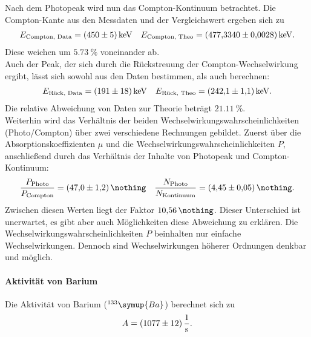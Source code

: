 Nach dem Photopeak wird nun das Compton-Kontinuum betrachtet.
Die Compton-Kante aus den Messdaten und der Vergleichswert ergeben sich zu
\begin{align*}
	E_{\text{Compton, Data}} = \SI{450 (5)}{\kilo \electronvolt} && E_{\text{Compton, Theo}} = \SI{477.3340 (28)}{\kilo \electronvolt}.
\end{align*}
Diese weichen um $\SI{5.73}{\%}$ voneinander ab.\\

Auch der Peak, der sich durch die Rückstreuung der Compton-Wechselwirkung ergibt, lässt sich sowohl aus den Daten bestimmen, als auch berechnen:
\begin{align*}
	E_{\text{Rück, Data}} = \SI{191 (18)}{\kilo \electronvolt} && E_{\text{Rück, Theo}} = \SI{242.1(11)}{\kilo \electronvolt}.
\end{align*}
Die relative Abweichung von Daten zur Theorie beträgt $\SI{21.11}{\%}$.\\

Weiterhin wird das Verhältnis der beiden Wechselwirkungswahrscheinlichkeiten (Photo/Compton) über zwei verschiedene Rechnungen gebildet.
Zuerst über die Absorptionskoeffizienten $\mu$ und die Wechselwirkungswahrscheinlichkeiten $P$, anschließend durch das Verhältnis der Inhalte von Photopeak und Compton-Kontinuum:
\begin{align*}
	\frac{ P_{\text{Photo} } }{ P_{ \text{Compton} } } = \SI{47.0 (12)}{\nothing} && 	\frac{ N_{\text{Photo}} }{ N_{\text{Kontinuum}} } = \SI{4.45 (5)}{\nothing}.
\end{align*}
Zwischen diesen Werten liegt der Faktor $\SI{10.56}{\nothing}$.
Dieser Unterschied ist unerwartet, es gibt aber auch Möglichkeiten diese Abweichung zu erklären.
Die Wechselwirkungswahrscheinlichkeiten $P$ beinhalten nur einfache Wechselwirkungen.
Dennoch sind Wechselwirkungen höherer Ordnungen denkbar und möglich.\\

\paragraph{Aktivität von Barium}

Die Aktivität von Barium ($^{133}\symup{Ba}$) berechnet sich zu
\begin{equation*}
    A = \SI{1077 (12)}{\frac{1}{s}}.
\end{equation*}

